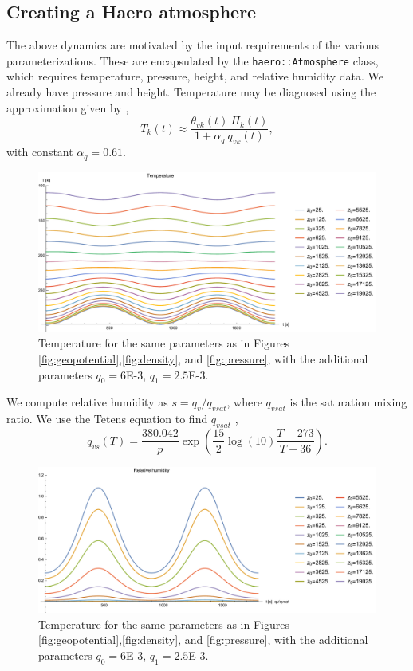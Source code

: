 \subsection{Creating a Haero atmosphere}

The above dynamics are motivated by the input requirements of the various parameterizations.  
These are encapsulated by the \texttt{haero::Atmosphere} class, which requires temperature, pressure, height, and relative humidity data. 
We already have pressure and height.
Temperature may be diagnosed using the approximation given by \cite[eq.~(2.3)]{KlempWilhelmson1978},
\begin{equation}\label{eq:approx_temp}
  T_k(t) \approx \frac{\theta_{vk}(t) ~ \Pi_k(t)}{1+\alpha_q ~ q_{vk}(t)},
\end{equation}
with constant $\alpha_q = 0.61$.

\begin{figure}[H]
  \centering
  \includegraphics[width=\linewidth]{figures/temperature_plot}
  \caption{Temperature for the same parameters as in Figures \ref{fig:geopotential},\ref{fig:density}, and \ref{fig:pressure}, with the additional parameters $q_{0}=6$E-3, $q_1=2.5$E-3.}\label{fig:temperature}
\end{figure}

We compute relative humidity as $s = q_v/q_{vsat}$, where $q_{vsat}$ is the saturation mixing ratio.
We use the Tetens equation to find $q_{vsat}$ \cite[eqn. (A1)]{SoongOgura1973},
\begin{equation}\label{eq:tetens}
  q_{vs}(T) = \frac{380.042}{p}\exp\left(\frac{15}{2}\log(10) \frac{T-273}{T-36}\right).
\end{equation}

\begin{figure}[H]
\centering
\includegraphics[width=\linewidth]{figures/relhumidity_plot}
\caption{Temperature for the same parameters as in Figures \ref{fig:geopotential},\ref{fig:density}, and \ref{fig:pressure}, with the additional parameters $q_{0}=6$E-3, $q_1=2.5$E-3.}\label{fig:humidity}
\end{figure}


